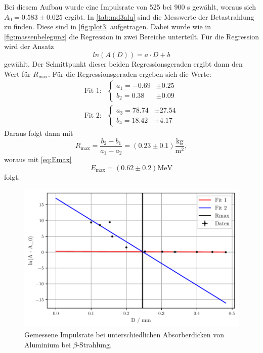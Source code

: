Bei diesem Aufbau wurde eine Impulsrate von 525 bei 900 s gewählt, woraus sich $A_0 = 0.583 \pm 0.025$ ergibt.
In \autoref{tab:md3alu} sind die Messwerte der Betastrahlung zu finden.
Diese sind in \autoref{fig:plot3} aufgetragen.
Dabei wurde wie in \autoref{fig:massenbelegung} die Regression in zwei Bereiche unterteilt.
Für die Regression wird der Ansatz
\begin{equation*}
    ln(A(D)) = a \cdot D + b
\end{equation*}
gewählt.
Der Schnittpunkt dieser beiden Regressionsgeraden ergibt dann den Wert für $R_\text{max}$.
Für die Regressionsgeraden ergeben sich die Werte:
\begin{align*}
    \text{Fit 1:}&\begin{cases}
    a_1= -0.69 &\pm 0.25 \\
    b_2= 0.38 &\pm 0.09 
    \end{cases}\\
    \text{Fit 2:}&\begin{cases}
    a_3= 78.74 &\pm 27.54\\
    b_4= 18.42 &\pm 4.17
    \end{cases}
\end{align*}
Daraus folgt dann mit
\begin{equation*}
    R_\text{max} = \frac{b_2 - b_1}{a_1 - a_2} = (0.23 \pm 0.1) \frac{\unit{\kilo\gram}}{\unit{\meter^2}} ,
\end{equation*}
woraus mit \autoref{eq:Emax} 
\begin{equation*}
    E_\text{max} = (0.62 \pm 0.2) \unit{\mega\eV}
\end{equation*}
folgt.
\begin{figure}
    \centering
    \includegraphics[width=0.7 \linewidth]{build/plot3.pdf}
    \caption{Gemessene Impulsrate bei unterschiedlichen Absorberdicken von Aluminium bei $\beta$-Strahlung.}
    \label{fig:plot3}
\end{figure}


